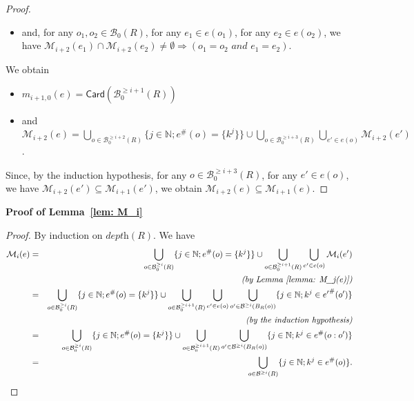 \documentclass{article}
\theoremstyle{plain}
\newcommand{\Nat}{\ensuremath{\mathbb{N}}}
\newcommand{\Card}[1]{\textsf{Card}\left( #1 \right)}
\newcommand{\boxes}[1]{\mathcal{B}(#1)}
\newcommand{\boxesatzero}[1]{\mathcal{B}_{0}(#1)}
\newcommand{\boxesgeq}[2]{\mathcal{B}^{\geq #2}(#1)}
\newcommand{\boxesatzerogeq}[2]{\mathcal{B}_0^{\geq #2}(#1)}
\begin{document}
\begin{proof}
\begin{itemize}
\item and, for any $o_1, o_2 \in \boxesatzero{R}$, for any $e_1 \in e(o_1)$, for any $e_2 \in e(o_2)$, we have $\mathcal{M}_{i+2}(e_1) \cap \mathcal{M}_{i+2}(e_2) \not= \emptyset \Rightarrow (o_1 = o_2 \textit{ and } e_1 = e_2)$.
\end{itemize}
We obtain 
\begin{itemize}
\item $m_{i+1, 0}(e) = \Card{\boxesatzerogeq{R}{i+1}}$
\item and $\mathcal{M}_{i+2}(e) = \bigcup_{o \in \boxesatzerogeq{R}{i+2}} \{ j \in \Nat ; e^\#(o) = \{ k^j \} \} \cup \bigcup_{o \in \boxesatzerogeq{R}{i+3}} \bigcup_{e' \in e(o)} \mathcal{M}_{i+2}(e')$.
\end{itemize}
Since, by the induction hypothesis, for any $o \in \boxesatzerogeq{R}{i+3}$, for any $e' \in e(o)$, we have $\mathcal{M}_{i+2}(e') \subseteq \mathcal{M}_{i+1}(e')$, we obtain $\mathcal{M}_{i+2}(e) \subseteq \mathcal{M}_{i+1}(e)$.
\end{proof}

\begin{comment}
\begin{cor}\label{cor: M_i}
Let $R$ be a $\circ$-PS. Let $k > \Card{\boxes{R}}$. Let $e$ be a $k$-injective pseudo-experiment of $R$. Let $i \in \Nat$. Then, for any $o \in \boxesatzero{R}$, for any $e' \in e(o)$, we have $\mathcal{M}_i(e') \subseteq \mathcal{M}_i(e)$.
\end{cor}

\begin{proof}
In the case $i > 0$, notice that whenever $\mathcal{M}_{i+1}(e') \not= \emptyset$, we have $o \in \boxesatzerogeq{R}{i+2}$.
\end{proof}
\end{comment}

\textbf{Proof of Lemma~\ref{lem: M_i}}

\begin{proof}
By induction on $\textit{depth}(R)$. We have
\begin{eqnarray*}
\mathcal{M}_i(e) & = & \bigcup_{o \in \boxesatzerogeq{R}{i}} \{ j \in \Nat ; e^\#(o) = \{ k ^j \} \} \cup \bigcup_{o \in \boxesatzerogeq{R}{i+1}} \bigcup_{e' \in e(o)} \mathcal{M}_i(e')\\
& & \textit{(by Lemma~\ref{lemma: M_j(e)})} \allowdisplaybreaks\\
& = & \bigcup_{o \in \boxesatzerogeq{R}{i}} \{ j \in \Nat ; e^\#(o) = \{ k^j \} \} \cup \bigcup_{o \in \boxesatzerogeq{R}{i+1}} \bigcup_{e' \in e(o)} \bigcup_{o' \in \boxesgeq{B_R(o)}{i}} \{ j \in \Nat ; k^j \in {e'}^\#(o') \}\\
& & \textit{(by the induction hypothesis)} \allowdisplaybreaks\\
& = & \bigcup_{o \in \boxesatzerogeq{R}{i}} \{ j \in \Nat ; e^\#(o) = \{ k^j \} \} \cup \bigcup_{o \in \boxesatzerogeq{R}{i+1}} \bigcup_{o' \in \boxesgeq{B_R(o)}{i}} \{ j \in \Nat ; k^j \in {e}^\#(o:o') \}\\
& = & \bigcup_{o \in \boxesgeq{R}{i}} \{ j \in \Nat ; k^j \in e^\#(o) \} .
\end{eqnarray*}
\end{proof}
\end{document}
